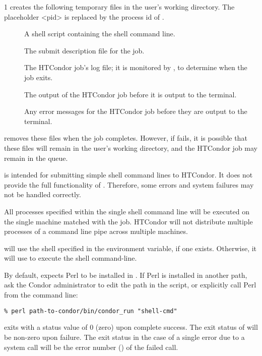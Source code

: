 \begin{ManPage}{\label{man-condor-run}}{1}
 creates the following temporary files in the user's
working directory.
The placeholder <pid> is replaced by the process id
of .
\begin{description}
\item[] A shell script containing the shell
  command line.
\item[] The submit description file for
  the job.
\item[] The HTCondor job's log file; it is
  monitored by , to determine when the job exits.
\item[] The output of the HTCondor
  job before it is output to the terminal.
\item[] Any error messages for the HTCondor
  job  before they are output to the terminal.
\end{description}
 removes these files when the job completes.  However, if
 fails, it is possible that these files will remain in the
user's working directory, and the HTCondor job may remain in the queue.

\GenRem

 is intended for submitting simple shell command lines to
HTCondor.  It does not provide the full functionality of
.  Therefore, some  errors and
system failures may not be handled correctly. 

All processes specified within the single shell command line
will be executed on the single machine
matched with the job.  HTCondor will not distribute multiple
processes of a command line pipe across multiple machines.

 will use the shell specified in the  environment
variable, if one exists.  Otherwise, it will use  to execute
the shell command-line.

By default,  expects Perl to be installed in
.  If Perl is installed in another path, 
ask the Condor administrator to edit the path in the 
script, or explicitly call Perl from the command line:

\begin{verbatim}
% perl path-to-condor/bin/condor_run "shell-cmd"
\end{verbatim}


\ExitStatus

 exits with a status value of 0 (zero) upon complete success.
The exit status of  will be non-zero upon failure.
The exit status in the case of a single error due to a system call
will be the error number () of the failed call.

\end{ManPage}
